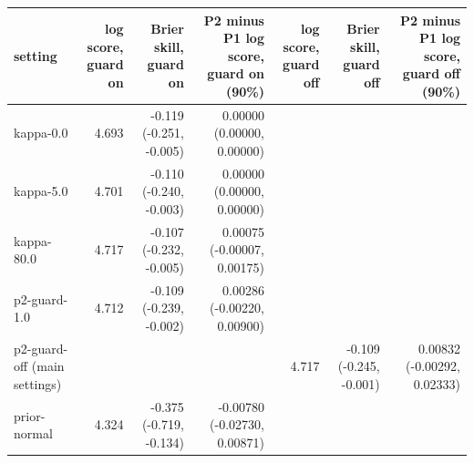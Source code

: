 \begin{tabular}{lrrrrrr}
\toprule
setting & log score, guard on & Brier skill, guard on & P2 minus P1 log score, guard on (90\%) & log score, guard off & Brier skill, guard off & P2 minus P1 log score, guard off (90\%) \\
\midrule
kappa-0.0 & 4.693 & -0.119 (-0.251, -0.005) & 0.00000 (0.00000, 0.00000) &  &  &  \\
kappa-5.0 & 4.701 & -0.110 (-0.240, -0.003) & 0.00000 (0.00000, 0.00000) &  &  &  \\
kappa-80.0 & 4.717 & -0.107 (-0.232, -0.005) & 0.00075 (-0.00007, 0.00175) &  &  &  \\
p2-guard-1.0 & 4.712 & -0.109 (-0.239, -0.002) & 0.00286 (-0.00220, 0.00900) &  &  &  \\
p2-guard-off (main settings) &  &  &  & 4.717 & -0.109 (-0.245, -0.001) & 0.00832 (-0.00292, 0.02333) \\
prior-normal & 4.324 & -0.375 (-0.719, -0.134) & -0.00780 (-0.02730, 0.00871) &  &  &  \\
\bottomrule
\end{tabular}

